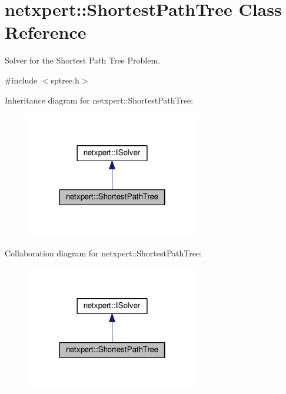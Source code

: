 \hypertarget{classnetxpert_1_1ShortestPathTree}{}\section{netxpert\+:\+:Shortest\+Path\+Tree Class Reference}
\label{classnetxpert_1_1ShortestPathTree}


Solver for the Shortest Path Tree Problem.  




{\ttfamily \#include $<$sptree.\+h$>$}



Inheritance diagram for netxpert\+:\+:Shortest\+Path\+Tree\+:\nopagebreak
\begin{figure}[H]
\begin{center}
\leavevmode
\includegraphics[width=214pt]{classnetxpert_1_1ShortestPathTree__inherit__graph}
\end{center}
\end{figure}


Collaboration diagram for netxpert\+:\+:Shortest\+Path\+Tree\+:\nopagebreak
\begin{figure}[H]
\begin{center}
\leavevmode
\includegraphics[width=214pt]{classnetxpert_1_1ShortestPathTree__coll__graph}
\end{center}
\end{figure}
